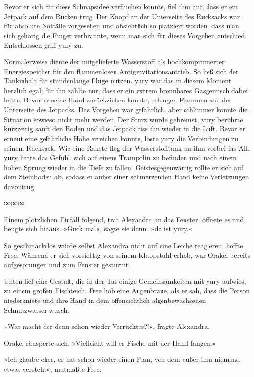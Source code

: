 Bevor er sich für diese Schnapsidee verfluchen konnte, fiel ihm auf, dass er ein Jetpack auf dem Rücken trug. Der Knopf an der Unterseite des Rucksacks war für absolute Notfälle vorgesehen und absichtlich so platziert worden, dass man sich gehörig die Finger verbrannte, wenn man sich für dieses Vorgehen entschied. Entschlossen griff yury zu.

Normalerweise diente der mitgelieferte Wasserstoff als hochkomprimierter Energiespeicher für den flammenlosen Antigravitationsantrieb. So ließ sich der Tankinhalt für stundenlange Flüge nutzen. yury war das in diesem Moment herzlich egal; für ihn zählte nur, dass er ein extrem brennbares Gasgemisch dabei hatte. Bevor er seine Hand zurückziehen konnte, schlugen Flammen aus der Unterseite des Jetpacks. Das Vorgehen war gefährlich, aber schlimmer konnte die Situation sowieso nicht mehr werden. Der Sturz wurde gebremst, yury berührte kurzzeitig sanft den Boden und das Jetpack riss ihn wieder in die Luft. Bevor er erneut eine gefährliche Höhe erreichen konnte, löste yury die Verbindungen zu seinem Rucksack. Wie eine Rakete flog der Wasserstofftank an ihm vorbei ins All. yury hatte das Gefühl, sich auf einem Trampolin zu befinden und nach einem hohen Sprung wieder in die Tiefe zu fallen. Geistesgegenwärtig rollte er sich auf dem Steinboden ab, sodass er außer einer schmerzenden Hand keine Verletzungen davontrug.

\begin{center}
	∞∞∞
\end{center}

Einem plötzlichen Einfall folgend, trat Alexandra an das Fenster, öffnete es und beugte sich hinaus. »Guck mal«, sagte sie dann. »da ist yury.«

So geschmackslos würde selbst Alexandra nicht auf eine Leiche reagieren, hoffte Free. Während er sich vorsichtig von seinem Klappstuhl erhob, war Orakel bereits aufgesprungen und zum Fenster gestürmt.

Unten lief eine Gestalt, die in der Tat einige Gemeinsamkeiten mit yury aufwies, zu einem großen Fischteich. Free hob eine Augenbraue, als er sah, dass die Person niederkniete und ihre Hand in dem offensichtlich algenbewachsenen Schnutzwasser wusch.

»Was macht der denn schon wieder Verrücktes?!«, fragte Alexandra.

Orakel räusperte sich. »Vielleicht will er Fische mit der Hand fangen.«

»Ich glaube eher, er hat schon wieder einen Plan, von dem außer ihm niemand etwas versteht«, mutmaßte Free.

